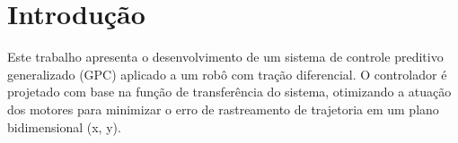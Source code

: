 \section{Introdução}

Este trabalho apresenta o desenvolvimento de um sistema
 de controle preditivo generalizado (GPC) aplicado a um robô 
 com tração diferencial. 
O controlador é projetado com base na função de transferência
do sistema, otimizando a atuação dos 
motores para minimizar o erro de rastreamento de 
trajetoria em um plano bidimensional (x, y). 
